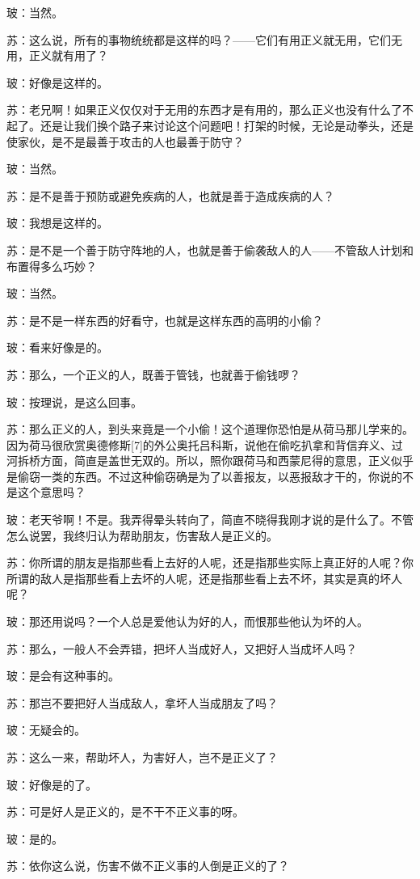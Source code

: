 \documentclass[12pt,oneside]{book}
\begin{document}
玻：当然。

苏：这么说，所有的事物统统都是这样的吗？——它们有用正义就无用，它们无用，正义就有用了？

玻：好像是这样的。

苏：老兄啊！如果正义仅仅对于无用的东西才是有用的，那么正义也没有什么了不起了。还是让我们换个路子来讨论这个问题吧！打架的时候，无论是动拳头，还是使家伙，是不是最善于攻击的人也最善于防守？

玻：当然。

苏：是不是善于预防或避免疾病的人，也就是善于造成疾病的人？

玻：我想是这样的。

苏：是不是一个善于防守阵地的人，也就是善于偷袭敌人的人——不管敌人计划和布置得多么巧妙？

玻：当然。

苏：是不是一样东西的好看守，也就是这样东西的高明的小偷？

玻：看来好像是的。

苏：那么，一个正义的人，既善于管钱，也就善于偷钱啰？

玻：按理说，是这么回事。

苏：那么正义的人，到头来竟是一个小偷！这个道理你恐怕是从荷马那儿学来的。因为荷马很欣赏奥德修斯[7]的外公奥托吕科斯，说他在偷吃扒拿和背信弃义、过河拆桥方面，简直是盖世无双的。所以，照你跟荷马和西蒙尼得的意思，正义似乎是偷窃一类的东西。不过这种偷窃确是为了以善报友，以恶报敌才干的，你说的不是这个意思吗？

玻：老天爷啊！不是。我弄得晕头转向了，简直不晓得我刚才说的是什么了。不管怎么说罢，我终归认为帮助朋友，伤害敌人是正义的。

苏：你所谓的朋友是指那些看上去好的人呢，还是指那些实际上真正好的人呢？你所谓的敌人是指那些看上去坏的人呢，还是指那些看上去不坏，其实是真的坏人呢？

玻：那还用说吗？一个人总是爱他认为好的人，而恨那些他认为坏的人。

苏：那么，一般人不会弄错，把坏人当成好人，又把好人当成坏人吗？

玻：是会有这种事的。

苏：那岂不要把好人当成敌人，拿坏人当成朋友了吗？

玻：无疑会的。

苏：这么一来，帮助坏人，为害好人，岂不是正义了？

玻：好像是的了。

苏：可是好人是正义的，是不干不正义事的呀。

玻：是的。

苏：依你这么说，伤害不做不正义事的人倒是正义的了？
\end{document}
